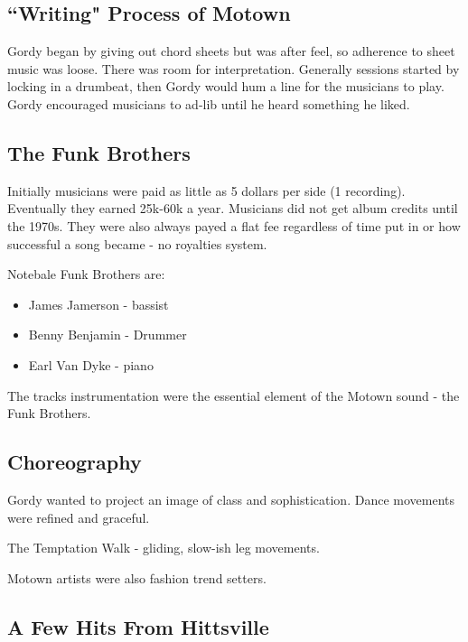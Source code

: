 \documentclass[12pt, a4paper, twoside, openright, titlepage]{book}
\begin{document}
\subsection{``Writing" Process of Motown}


Gordy began by giving out chord sheets but was after feel, so adherence to sheet music was loose. There was room for interpretation. Generally sessions started by locking in a drumbeat, then Gordy would hum a line for the musicians to play. Gordy encouraged musicians to ad-lib until he heard something he liked.


\subsection{The Funk Brothers}


Initially musicians were paid as little as 5 dollars per side (1 recording). Eventually they earned 25k-60k a year. Musicians did not get album credits until the 1970s. They were also always payed a flat fee regardless of time put in or how successful a song became - no royalties system.

Notebale Funk Brothers are: \begin{itemize}
    \item James Jamerson - bassist
    \item Benny Benjamin - Drummer 
    \item Earl Van Dyke - piano
\end{itemize}

The tracks instrumentation were the essential element of the Motown sound - the Funk Brothers.


\subsection{Choreography}

Gordy wanted to project an image of class and sophistication. Dance movements were refined and graceful.

\begin{eg}{}{}
    The Temptation Walk - gliding, slow-ish leg movements.
\end{eg}

Motown artists were also fashion trend setters.


\subsection{A Few Hits From Hittsville}
\end{document}
